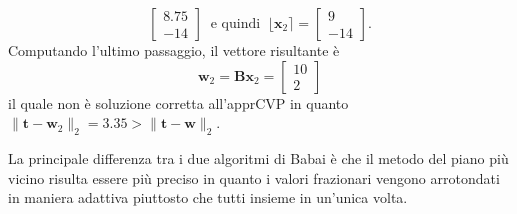 \begin{exmp}
\[\begin{bmatrix}
        8.75\\
        -14
    \end{bmatrix}
    \ \text{ e quindi } \ \lfloor\mathbf{x}_2\rceil = 
    \begin{bmatrix}
        9\\
        -14
    \end{bmatrix}.
    \]
    Computando l'ultimo passaggio, il vettore risultante è
    \[
        \mathbf{w}_2 = \mathbf{B}\mathbf{x}_2 =
        \begin{bmatrix}
            10\\
            2
        \end{bmatrix}
    \]
    il quale non è soluzione corretta all'apprCVP in quanto 
    $\|\mathbf{t}-\mathbf{w}_2\|_2 = 3.35 > \|\mathbf{t}-\mathbf{w}\|_2$. 
\end{exmp}
La principale differenza tra i due algoritmi di Babai è che il metodo del piano più vicino
risulta essere più preciso in quanto i valori frazionari vengono arrotondati in maniera
adattiva piuttosto che tutti insieme in un'unica volta.  

